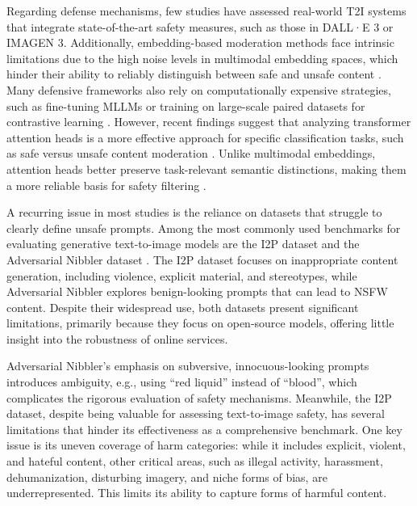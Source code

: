 \documentclass[acmsmall]{acmart}
\newcommand{\dalle}{DALL·E\xspace}
\newcommand{\imagen}{IMAGEN\xspace}
\newcommand{\virgolette}[1]{``#1''}
\begin{document}
Regarding defense mechanisms, few studies have assessed real-world T2I systems that integrate state-of-the-art safety measures, such as those in \dalle 3 or \imagen 3. Additionally, embedding-based moderation methods face intrinsic limitations due to the high noise levels in multimodal embedding spaces, which hinder their ability to reliably distinguish between safe and unsafe content \cite{liu2024latent}. Many defensive frameworks also rely on computationally expensive strategies, such as fine-tuning MLLMs or training on large-scale paired datasets for contrastive learning \cite{liu2024latent,poppi2024safe,helff2024llavaguard}. However, recent findings suggest that analyzing transformer attention heads is a more effective approach for specific classification tasks, such as safe versus unsafe content moderation \cite{gandelsman2023interpreting}. Unlike multimodal embeddings, attention heads better preserve task-relevant semantic distinctions, making them a more reliable basis for safety filtering \cite{elhage2021mathematical,gandelsman2023interpreting}.

A recurring issue in most studies is the reliance on datasets that struggle to clearly define unsafe prompts. Among the most commonly used benchmarks for evaluating generative text-to-image models are the I2P dataset \cite{schramowski2023safe} and the Adversarial Nibbler dataset \cite{parrish2023adversarial}. The I2P dataset focuses on inappropriate content generation, including violence, explicit material, and stereotypes, while Adversarial Nibbler explores benign-looking prompts that can lead to NSFW content. Despite their widespread use, both datasets present significant limitations, primarily because they focus on open-source models, offering little insight into the robustness of online services.

Adversarial Nibbler's emphasis on subversive, innocuous-looking prompts introduces ambiguity, e.g., using \virgolette{red liquid} instead of \virgolette{blood}, which complicates the rigorous evaluation of safety mechanisms. Meanwhile, the I2P dataset, despite being valuable for assessing text-to-image safety, has several limitations that hinder its effectiveness as a comprehensive benchmark. One key issue is its uneven coverage of harm categories: while it includes explicit, violent, and hateful content, other critical areas, such as illegal activity, harassment, dehumanization, disturbing imagery, and niche forms of bias, are underrepresented. This limits its ability to capture forms of harmful content.
\end{document}
